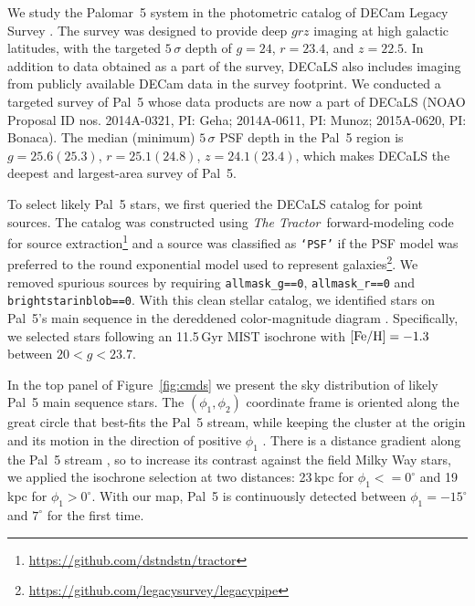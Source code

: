 \documentclass[twocolumn]{aastex62}
\newcommand{\tractor}{\textsl{The Tractor}}
\begin{document}
We study the Palomar~5 system in the photometric catalog of DECam Legacy Survey \citep[DECaLS, part of the DESI Legacy Imaging Surveys,][]{dey2019}.
The survey was designed to provide deep $grz$ imaging at high galactic latitudes, with the targeted $5\,\sigma$ depth of $g=24$, $r=23.4$, and $z=22.5$.
In addition to data obtained as a part of the survey, DECaLS also includes imaging from publicly available DECam data in the survey footprint.
We conducted a targeted survey of Pal~5 whose data products are now a part of DECaLS (NOAO Proposal ID nos. 2014A-0321, PI: Geha; 2014A-0611, PI: Munoz; 2015A-0620, PI: Bonaca).
The median (minimum) $5\,\sigma$ PSF depth in the Pal~5 region is $g=25.6(25.3)$, $r=25.1(24.8)$, $z=24.1(23.4)$, which makes DECaLS the deepest and largest-area survey of Pal~5.

To select likely Pal~5 stars, we first queried the DECaLS catalog for point sources.
The catalog was constructed using \tractor\ forward-modeling code for source extraction\footnote{\url{https://github.com/dstndstn/tractor}} and a source was classified as \texttt{`PSF'} if the PSF model was preferred to the round exponential model used to represent galaxies\footnote{\url{https://github.com/legacysurvey/legacypipe}}.
We removed spurious sources by requiring \texttt{allmask\_g==0}, \texttt{allmask\_r==0} and \texttt{brightstarinblob==0}.
With this clean stellar catalog, we identified stars on Pal~5's main sequence in the dereddened color-magnitude diagram \citep{Schlegel:1998}.
Specifically, we selected stars following an 11.5\,Gyr MIST isochrone with $\rm [Fe/H] = -1.3$ \citep{Choi:2016} between $20<g<23.7$.

In the top panel of Figure~\ref{fig:cmds} we present the sky distribution of likely Pal~5 main sequence stars.
The $(\phi_1,\phi_2)$ coordinate frame is oriented along the great circle that best-fits the Pal~5 stream, while keeping the cluster at the origin and its motion in the direction of positive $\phi_1$ \citep{gala}.
There is a distance gradient along the Pal~5 stream \citep{Ibata:2016}, so to increase its contrast against the field Milky Way stars, we applied the isochrone selection at two distances: 23\,kpc for $\phi_1<=0^\circ$ and 19\,kpc for $\phi_1>0^\circ$.
With our map, Pal~5 is continuously detected between $\phi_1=-15^\circ$ and $7^\circ$ for the first time.
\end{document}
